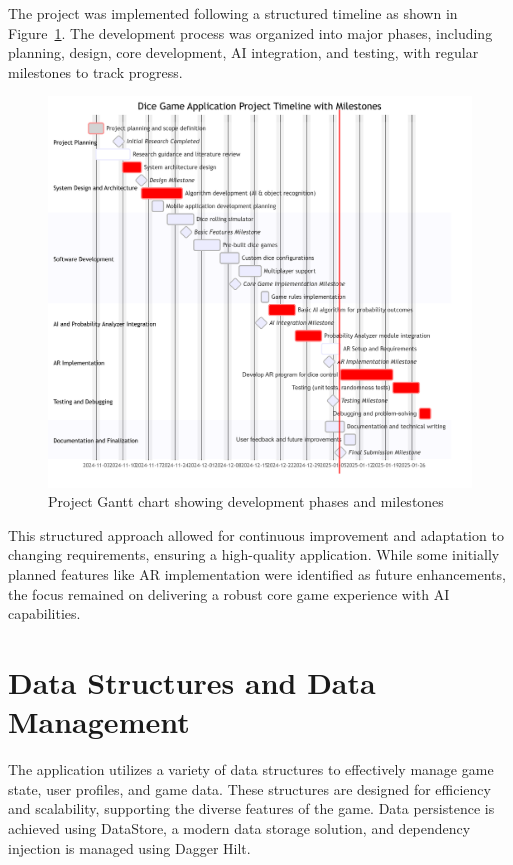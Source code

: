 The project was implemented following a structured timeline as shown in Figure~\ref{fig:gantt}. The development process was organized into major phases, including planning, design, core development, AI integration, and testing, with regular milestones to track progress.

\begin{figure}[ht!]
    \centering
    \includegraphics[width=\textwidth]{img/gantt_chart.png}
    \caption{Project Gantt chart showing development phases and milestones}
    \label{fig:gantt}
\end{figure}

This structured approach allowed for continuous improvement and adaptation to changing requirements, ensuring a high-quality application. While some initially planned features like AR implementation were identified as future enhancements, the focus remained on delivering a robust core game experience with AI capabilities.

\section{Data Structures and Data Management}

The application utilizes a variety of data structures to effectively manage game state, user profiles, and game data. These structures are designed for efficiency and scalability, supporting the diverse features of the game. Data persistence is achieved using DataStore, a modern data storage solution, and dependency injection is managed using Dagger Hilt.

